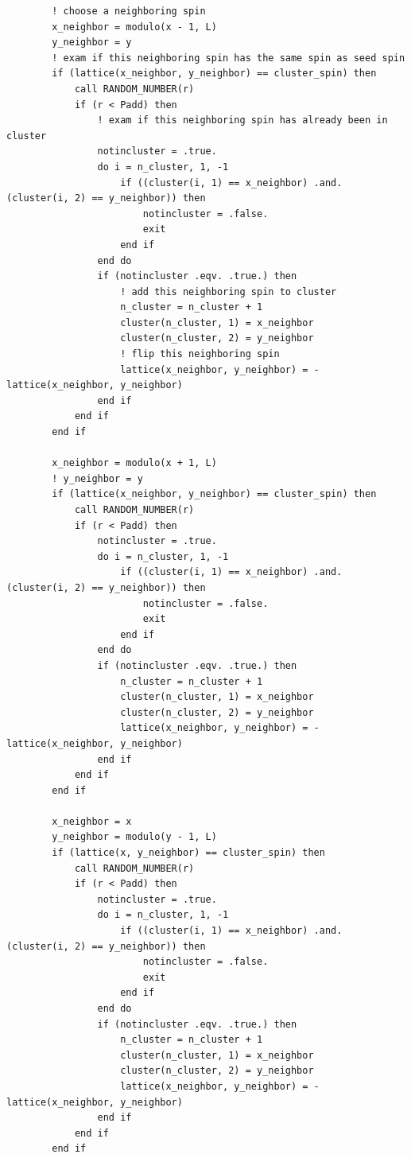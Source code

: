 \documentclass[UTF8,10pt,a4paper]{article}
\theoremstyle{Problem}
\theoremstyle{Solution}
\begin{document}
\begin{lstlisting}
        ! choose a neighboring spin
        x_neighbor = modulo(x - 1, L)
        y_neighbor = y
        ! exam if this neighboring spin has the same spin as seed spin
        if (lattice(x_neighbor, y_neighbor) == cluster_spin) then
            call RANDOM_NUMBER(r)
            if (r < Padd) then
                ! exam if this neighboring spin has already been in cluster
                notincluster = .true.
                do i = n_cluster, 1, -1
                    if ((cluster(i, 1) == x_neighbor) .and. (cluster(i, 2) == y_neighbor)) then
                        notincluster = .false.
                        exit
                    end if
                end do
                if (notincluster .eqv. .true.) then
                    ! add this neighboring spin to cluster
                    n_cluster = n_cluster + 1
                    cluster(n_cluster, 1) = x_neighbor
                    cluster(n_cluster, 2) = y_neighbor
                    ! flip this neighboring spin
                    lattice(x_neighbor, y_neighbor) = -lattice(x_neighbor, y_neighbor)
                end if
            end if
        end if

        x_neighbor = modulo(x + 1, L)
        ! y_neighbor = y
        if (lattice(x_neighbor, y_neighbor) == cluster_spin) then
            call RANDOM_NUMBER(r)
            if (r < Padd) then
                notincluster = .true.
                do i = n_cluster, 1, -1
                    if ((cluster(i, 1) == x_neighbor) .and. (cluster(i, 2) == y_neighbor)) then
                        notincluster = .false.
                        exit
                    end if
                end do
                if (notincluster .eqv. .true.) then
                    n_cluster = n_cluster + 1
                    cluster(n_cluster, 1) = x_neighbor
                    cluster(n_cluster, 2) = y_neighbor
                    lattice(x_neighbor, y_neighbor) = -lattice(x_neighbor, y_neighbor)
                end if
            end if
        end if

        x_neighbor = x
        y_neighbor = modulo(y - 1, L)
        if (lattice(x, y_neighbor) == cluster_spin) then
            call RANDOM_NUMBER(r)
            if (r < Padd) then
                notincluster = .true.
                do i = n_cluster, 1, -1
                    if ((cluster(i, 1) == x_neighbor) .and. (cluster(i, 2) == y_neighbor)) then
                        notincluster = .false.
                        exit
                    end if
                end do
                if (notincluster .eqv. .true.) then
                    n_cluster = n_cluster + 1
                    cluster(n_cluster, 1) = x_neighbor
                    cluster(n_cluster, 2) = y_neighbor
                    lattice(x_neighbor, y_neighbor) = -lattice(x_neighbor, y_neighbor)
                end if
            end if
        end if


\end{lstlisting}
\end{document}
